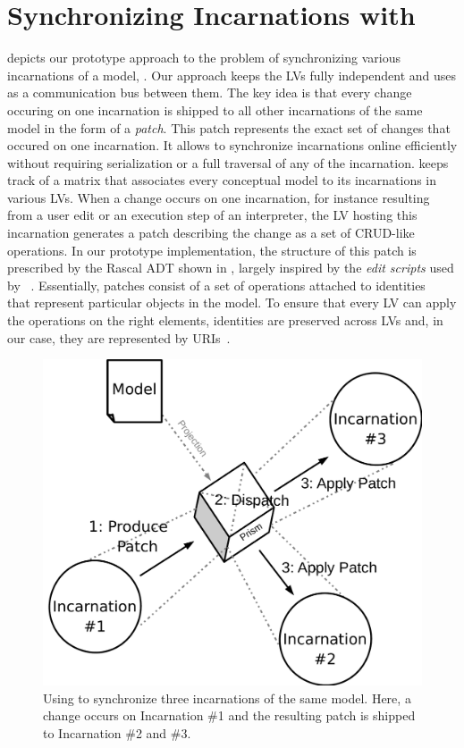 \section{Synchronizing Incarnations with \prism}
\label{sec:prism}

 depicts our prototype approach to the problem of synchronizing various incarnations of a model, \prism.
Our approach keeps the LVs fully independent and uses \prism as a communication bus between them.
The key idea is that every change occuring on one incarnation is shipped to all other incarnations of the same model in the form of a \emph{patch}.
This patch represents the exact set of changes that occured on one incarnation.
It allows to synchronize incarnations online efficiently without requiring serialization or a full traversal of any of the incarnation.
\prism keeps track of a matrix that associates every conceptual model to its incarnations in various LVs.
When a change occurs on one incarnation, for instance resulting from a user edit or an execution step of an interpreter, the LV hosting this incarnation generates a patch describing the change as a set of CRUD-like operations.
In our prototype implementation, the structure of this patch is prescribed by the Rascal ADT shown in , largely inspired by the \emph{edit scripts} used by \citeauthor{rozen2017towards}~\cite{rozen2017towards}.
Essentially, patches consist of a set of operations attached to identities~\cite{klint2016model} that represent particular objects in the model.
To ensure that every LV can apply the operations on the right elements, identities are preserved across LVs and, in our case, they are represented by URIs~\cite{berners2004uniform}.


\begin{figure}[bt]
	\centering
	\includegraphics[width=.6\columnwidth]{figures/prism}
	\caption{Using \prism to synchronize three incarnations of the same model. Here, a change occurs on Incarnation \#1 and the resulting patch is shipped to Incarnation \#2 and \#3.}
	\label{fig:prism}
\end{figure}


